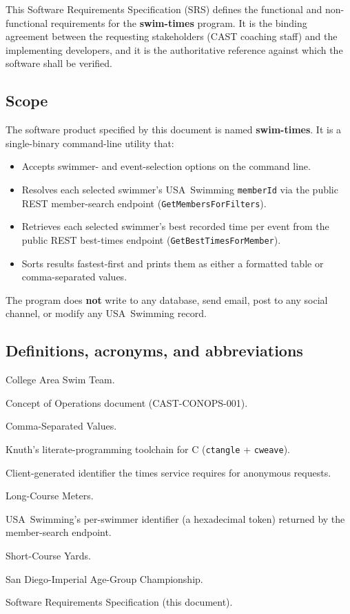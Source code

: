 \documentclass[12pt]{article}
\newcommand{\code}[1]{\texttt{#1}}
\begin{document}
This Software Requirements Specification (SRS) defines the
functional and non-functional requirements for the
\textbf{swim-times} program.  It is the binding agreement between
the requesting stakeholders (CAST coaching staff) and the
implementing developers, and it is the authoritative reference
against which the software shall be verified.

\subsection{Scope}

The software product specified by this document is named
\textbf{swim-times}.  It is a single-binary command-line utility
that:

\begin{itemize}
  \item Accepts swimmer- and event-selection options on the command line.
  \item Resolves each selected swimmer's USA~Swimming \code{memberId}
        via the public REST member-search endpoint
        (\code{GetMembersForFilters}).
  \item Retrieves each selected swimmer's best recorded time per event
        from the public REST best-times endpoint
        (\code{GetBestTimesForMember}).
  \item Sorts results fastest-first and prints them as either a
        formatted table or comma-separated values.
\end{itemize}

The program does \textbf{not} write to any database, send email,
post to any social channel, or modify any USA~Swimming record.

\subsection{Definitions, acronyms, and abbreviations}

\begin{description}[style=nextline,leftmargin=2.5cm,labelindent=0pt]
  \item[CAST] College Area Swim Team.
  \item[ConOps] Concept of Operations document
                (CAST-CONOPS-001).
  \item[CSV] Comma-Separated Values.
  \item[CWEB] Knuth's literate-programming toolchain for C
              (\code{ctangle} + \code{cweave}).
  \item[Device-Id] Client-generated identifier the times service
                   requires for anonymous requests.
  \item[LCM] Long-Course Meters.
  \item[memberId] USA~Swimming's per-swimmer identifier (a hexadecimal
                  token) returned by the member-search endpoint.
  \item[SCY] Short-Course Yards.
  \item[SDI~AGC] San Diego-Imperial Age-Group Championship.
  \item[SRS] Software Requirements Specification (this document).
\end{description}
\end{document}
